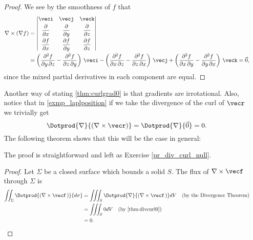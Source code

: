 
\begin{proof}
 We see by the smoothness of $f$ that
 \begin{align*}
  \nabla\times(\nabla f) &= \begin{vmatrix}
   \veci & \vecj & \veck \vspace{1mm}\\ \dfrac{\partial}{\partial x} & \dfrac{\partial}{\partial y} &
    \dfrac{\partial}{\partial z} \vspace{1mm}\\
   \dfrac{\partial f}{\partial x} & \dfrac{\partial f}{\partial y} & \dfrac{\partial f}{\partial z}
   \end{vmatrix}\\
  &= \left( \frac{\partial^2 f}{\partial y\,\partial z}-\frac{\partial^2 f}{\partial z\,\partial y} \right) \,\veci
   - \left( \frac{\partial^2 f}{\partial x\,\partial z}-\frac{\partial^2 f}{\partial z\,\partial x} \right) \,\vecj
   + \left( \frac{\partial^2 f}{\partial x\,\partial y}-\frac{\partial^2 f}{\partial y\,\partial x} \right) \,\veck
  = \vec0 ,
 \end{align*}
 since the mixed partial derivatives in each component are equal.
\end{proof}


Another way of stating \autoref{thm:curlgrad0} is that gradients are irrotational. Also, notice that in \autoref{exmp_laplposition} if we take the divergence of the curl of $\vecr$ we trivially get
\[
 \Dotprod{\nabla}{(\nabla\times\vecr)} = \Dotprod{\nabla}{\vec0} = 0 .
\]
The following theorem shows that this will be the case in general:


The proof is straightforward and left as Exercise \ref{pr_div_curl_null}.


\begin{proof}
 Let $\Sigma$ be a closed surface which bounds a solid $S$. The flux of $\nabla\times\vecf$ through $\Sigma$ is
 \begin{align*}
  \iint_{\Sigma} \Dotprod{(\nabla\times\vecf\,)}{d\sigma} &=
   \iiint_{S} \Dotprod{\nabla}{(\nabla\times\vecf\,)} dV\quad\text{(by the Divergence Theorem)}\\
   &= \iiint_{S} 0 dV \quad\text{(by \autoref{thm:divcurl0})}\\
   &= 0 .\qedhere
 \end{align*}
\end{proof}

